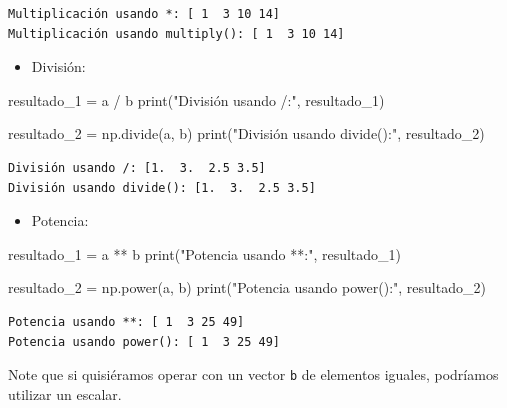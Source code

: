 \documentclass[
  letterpaper,
  DIV=11,
  numbers=noendperiod]{scrreprt}
\newenvironment{Shaded}{\begin{snugshade}}{\end{snugshade}}
\newcommand{\BuiltInTok}[1]{\textcolor[rgb]{0.00,0.23,0.31}{#1}}
\newcommand{\NormalTok}[1]{\textcolor[rgb]{0.00,0.23,0.31}{#1}}
\newcommand{\OperatorTok}[1]{\textcolor[rgb]{0.37,0.37,0.37}{#1}}
\newcommand{\StringTok}[1]{\textcolor[rgb]{0.13,0.47,0.30}{#1}}
\providecommand{\tightlist}{%
  \setlength{\itemsep}{0pt}\setlength{\parskip}{0pt}}\usepackage{longtable,booktabs,array}
\begin{document}
\begin{verbatim}
Multiplicación usando *: [ 1  3 10 14]
Multiplicación usando multiply(): [ 1  3 10 14]
\end{verbatim}

\begin{itemize}
\tightlist
\item
  División:
\end{itemize}

\begin{Shaded}
\begin{Highlighting}[]
\NormalTok{resultado\_1 }\OperatorTok{=}\NormalTok{ a }\OperatorTok{/}\NormalTok{ b}
\BuiltInTok{print}\NormalTok{(}\StringTok{"División usando /:"}\NormalTok{, resultado\_1) }

\NormalTok{resultado\_2 }\OperatorTok{=}\NormalTok{ np.divide(a, b)}
\BuiltInTok{print}\NormalTok{(}\StringTok{"División usando divide():"}\NormalTok{, resultado\_2) }
\end{Highlighting}
\end{Shaded}

\begin{verbatim}
División usando /: [1.  3.  2.5 3.5]
División usando divide(): [1.  3.  2.5 3.5]
\end{verbatim}

\begin{itemize}
\tightlist
\item
  Potencia:
\end{itemize}

\begin{Shaded}
\begin{Highlighting}[]
\NormalTok{resultado\_1 }\OperatorTok{=}\NormalTok{ a }\OperatorTok{**}\NormalTok{ b}
\BuiltInTok{print}\NormalTok{(}\StringTok{"Potencia usando **:"}\NormalTok{, resultado\_1) }

\NormalTok{resultado\_2 }\OperatorTok{=}\NormalTok{ np.power(a, b)}
\BuiltInTok{print}\NormalTok{(}\StringTok{"Potencia usando power():"}\NormalTok{, resultado\_2) }
\end{Highlighting}
\end{Shaded}

\begin{verbatim}
Potencia usando **: [ 1  3 25 49]
Potencia usando power(): [ 1  3 25 49]
\end{verbatim}

\begin{tcolorbox}[enhanced jigsaw, opacitybacktitle=0.6, toptitle=1mm, toprule=.15mm, arc=.35mm, breakable, bottomrule=.15mm, opacityback=0, leftrule=.75mm, rightrule=.15mm, title=\textcolor{quarto-callout-note-color}{\faInfo}\hspace{0.5em}{Note}, left=2mm, bottomtitle=1mm, colframe=quarto-callout-note-color-frame, colback=white, titlerule=0mm, coltitle=black, colbacktitle=quarto-callout-note-color!10!white]

Note que si quisiéramos operar con un vector \texttt{b} de elementos
iguales, podríamos utilizar un escalar.

\end{tcolorbox}
\end{document}
